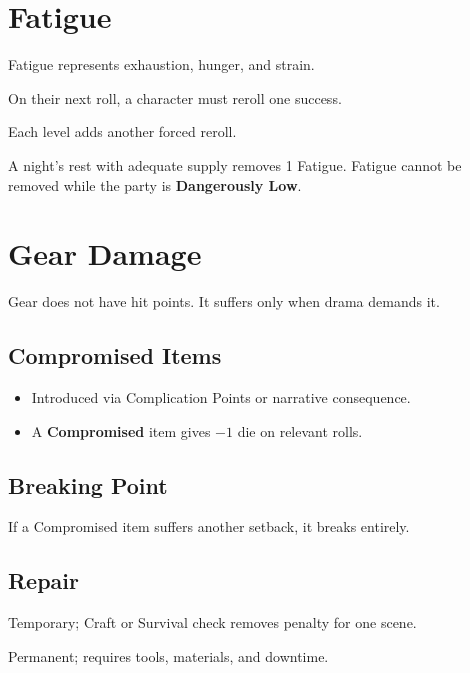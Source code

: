 \documentclass[12pt]{article}
\begin{document}
\section{Fatigue}
Fatigue represents exhaustion, hunger, and strain.

\begin{description}[leftmargin=2cm]
  \item[Effect:] On their next roll, a character must reroll one success.
  \item[Stacking:] Each level adds another forced reroll.
  \item[Recovery:] A night’s rest with adequate supply removes 1 Fatigue.
    Fatigue cannot be removed while the party is \textbf{Dangerously Low}.
\end{description}

\section{Gear Damage}
Gear does not have hit points. It suffers only when drama demands it.

\subsection*{Compromised Items}
\begin{itemize}
  \item Introduced via Complication Points or narrative consequence.
  \item A \textbf{Compromised} item gives \(-1\) die on relevant rolls.
\end{itemize}

\subsection*{Breaking Point}
If a Compromised item suffers another setback, it breaks entirely.

\subsection*{Repair}
\begin{description}[leftmargin=2cm]
  \item[Field Repair:] Temporary; Craft or Survival check removes penalty for
    one scene.
  \item[Proper Repair:] Permanent; requires tools, materials, and downtime.
\end{description}
\end{document}
